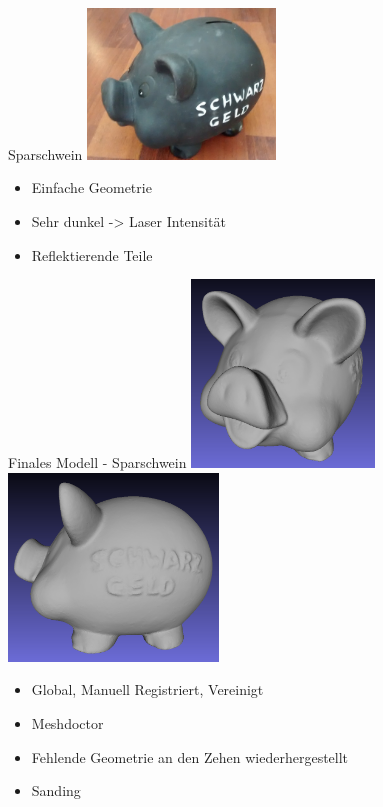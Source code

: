 \documentclass[11pt]{beamer}
\begin{document}
\begin{frame}{Sparschwein}
\center
	\includegraphics[width=5cm]{images/sparschwein/photo.jpg}
	\begin{block}{}
		\begin{itemize}
			\item Einfache Geometrie
			\item Sehr dunkel -> Laser Intensität
			\item Reflektierende Teile
		\end{itemize}
	\end{block}

\end{frame}

\begin{frame}{Finales Modell - Sparschwein}
\center
	\includegraphics[height=5cm]{images/sparschwein/final2}
	\includegraphics[height=5cm]{images/sparschwein/final3}
	\begin{block}{}
		\begin{itemize}
			\item Global, Manuell Registriert, Vereinigt
			\item Meshdoctor
			\item Fehlende Geometrie an den Zehen wiederhergestellt
			\item Sanding
		\end{itemize}
	\end{block}
\end{frame}
\end{document}
